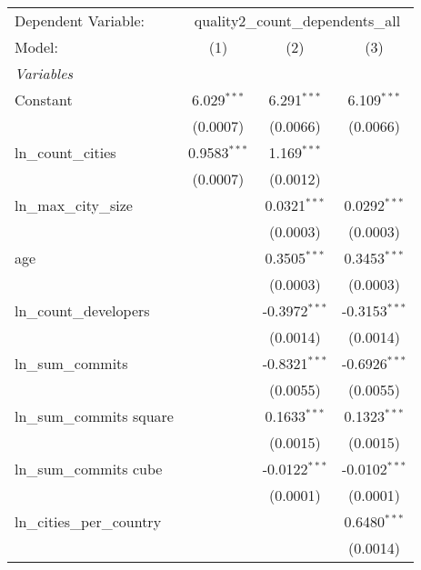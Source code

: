 
\begingroup
\centering
\begin{tabular}{lccc}
   \tabularnewline \midrule \midrule
   Dependent Variable: & \multicolumn{3}{c}{quality2\_count\_dependents\_all}\\
   Model:                      & (1)            & (2)             & (3)\\  
   \midrule
   \emph{Variables}\\
   Constant                    & 6.029$^{***}$  & 6.291$^{***}$   & 6.109$^{***}$\\   
                               & (0.0007)       & (0.0066)        & (0.0066)\\   
   ln\_count\_cities           & 0.9583$^{***}$ & 1.169$^{***}$   &   \\   
                               & (0.0007)       & (0.0012)        &   \\   
   ln\_max\_city\_size         &                & 0.0321$^{***}$  & 0.0292$^{***}$\\   
                               &                & (0.0003)        & (0.0003)\\   
   age                         &                & 0.3505$^{***}$  & 0.3453$^{***}$\\   
                               &                & (0.0003)        & (0.0003)\\   
   ln\_count\_developers       &                & -0.3972$^{***}$ & -0.3153$^{***}$\\   
                               &                & (0.0014)        & (0.0014)\\   
   ln\_sum\_commits            &                & -0.8321$^{***}$ & -0.6926$^{***}$\\   
                               &                & (0.0055)        & (0.0055)\\   
   ln\_sum\_commits square     &                & 0.1633$^{***}$  & 0.1323$^{***}$\\   
                               &                & (0.0015)        & (0.0015)\\   
   ln\_sum\_commits cube       &                & -0.0122$^{***}$ & -0.0102$^{***}$\\   
                               &                & (0.0001)        & (0.0001)\\   
   ln\_cities\_per\_country    &                &                 & 0.6480$^{***}$\\   
                               &                &                 & (0.0014)\\   

\end{tabular}
